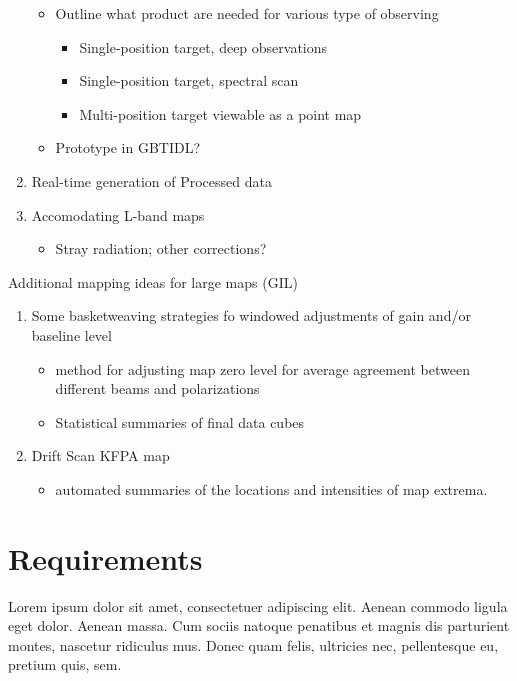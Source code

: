 \documentclass[paper=a4, fontsize=11pt]{scrartcl}	%
\numberwithin{equation}{section}															%
\numberwithin{figure}{section}																%
\numberwithin{table}{section}																%
\begin{document}
\begin{enumerate}
  \begin{itemize}
    \item Outline what product are needed for various type of observing
    \begin{itemize}
      \item Single-position target, deep observations
      \item Single-position target, spectral scan
      \item Multi-position target viewable as a point map
    \end{itemize}
    \item Prototype in GBTIDL?
  \end{itemize}
\item Real-time generation of Processed data
\item Accomodating L-band maps
  \begin{itemize}
    \item Stray radiation; other corrections?
  \end{itemize}
\end {enumerate}

Additional mapping ideas for large maps (GIL)

\begin{enumerate}
\item Some basketweaving strategies fo windowed adjustments of gain and/or baseline level
  \begin{itemize}
    \item method for adjusting map zero level for average agreement between different beams and polarizations
    \item Statistical summaries of final data cubes
  \end{itemize}
\item Drift Scan KFPA map
  \begin {itemize}
    \item automated summaries of the locations and intensities of map extrema.
  \end {itemize}
\end{enumerate}

\section{Requirements}
Lorem ipsum dolor sit amet, consectetuer adipiscing elit. Aenean commodo ligula eget dolor. Aenean massa. Cum sociis natoque penatibus et magnis dis parturient montes, nascetur ridiculus mus. Donec quam felis, ultricies nec, pellentesque eu, pretium quis, sem. 
\end{document}

